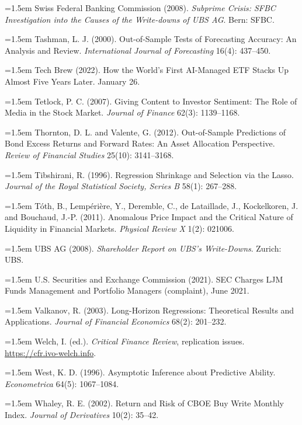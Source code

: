 \hangindent=1.5em Swiss Federal Banking Commission (2008). \emph{Subprime Crisis: SFBC Investigation into the Causes of the Write-downs of UBS AG}. Bern: SFBC.

\hangindent=1.5em Tashman, L. J. (2000). Out-of-Sample Tests of Forecasting Accuracy: An Analysis and Review. \emph{International Journal of Forecasting} 16(4): 437--450.

\hangindent=1.5em Tech Brew (2022). How the World's First AI-Managed ETF Stacks Up Almost Five Years Later. January 26.

\hangindent=1.5em Tetlock, P. C. (2007). Giving Content to Investor Sentiment: The Role of Media in the Stock Market. \emph{Journal of Finance} 62(3): 1139--1168.

\hangindent=1.5em Thornton, D. L. and Valente, G. (2012). Out-of-Sample Predictions of Bond Excess Returns and Forward Rates: An Asset Allocation Perspective. \emph{Review of Financial Studies} 25(10): 3141--3168.

\hangindent=1.5em Tibshirani, R. (1996). Regression Shrinkage and Selection via the Lasso. \emph{Journal of the Royal Statistical Society, Series B} 58(1): 267--288.

\hangindent=1.5em T\'oth, B., Lemp\'eri\`ere, Y., Deremble, C., de Lataillade, J., Kockelkoren, J. and Bouchaud, J.-P. (2011). Anomalous Price Impact and the Critical Nature of Liquidity in Financial Markets. \emph{Physical Review X} 1(2): 021006.

\hangindent=1.5em UBS AG (2008). \emph{Shareholder Report on UBS's Write-Downs}. Zurich: UBS.

\hangindent=1.5em U.S. Securities and Exchange Commission (2021). SEC Charges LJM Funds Management and Portfolio Managers (complaint), June 2021.

\hangindent=1.5em Valkanov, R. (2003). Long-Horizon Regressions: Theoretical Results and Applications. \emph{Journal of Financial Economics} 68(2): 201--232.

\hangindent=1.5em Welch, I. (ed.). \emph{Critical Finance Review}, replication issues. \url{https://cfr.ivo-welch.info}.

\hangindent=1.5em West, K. D. (1996). Asymptotic Inference about Predictive Ability. \emph{Econometrica} 64(5): 1067--1084.

\hangindent=1.5em Whaley, R. E. (2002). Return and Risk of CBOE Buy Write Monthly Index. \emph{Journal of Derivatives} 10(2): 35--42.

